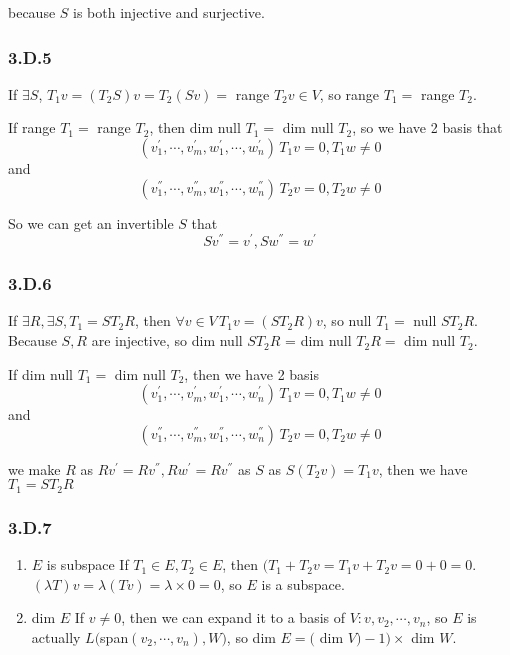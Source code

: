 because $S$ is both injective and surjective.

\subsubsection*{3.D.5}

If $\exists S$, $T_{1}v = (T_{2}S)v = T_{2}(Sv) = $ range $T_{2} v\in V$, so range $T_{1} = $ range $T_{2}$.

If range $T_{1} = $ range $T_{2}$, then dim null $T_{1} = $ dim null $T_{2}$, so we have 2 basis that
\[(v^{'}_{1}, \cdots, v^{'}_{m}, w^{'}_{1}, \cdots, w^{'}_{n})\, T_{1}v = 0, T_{1}w \neq 0\]
and
\[(v^{''}_{1}, \cdots, v^{''}_{m}, w^{''}_{1}, \cdots, w^{''}_{n})\, T_{2}v = 0, T_{2}w \neq 0\]

So we can get an invertible $S$ that
\[Sv^{''} = v^{'}, Sw^{''} = w^{'}\]

\subsubsection*{3.D.6}

If $\exists R, \exists S, T_{1} = ST_{2}R$, then $\forall v\in V\, T_{1}v = (ST_{2}R)v $, so null $T_{1} = $ null $ST_{2}R$.
Because $S,R$ are injective, so dim null $ST_{2}R$ = dim null $T_{2}R = $ dim null $T_{2}$.

If dim null $T_{1} = $ dim null $T_{2}$, then we have 2 basis
\[(v^{'}_{1}, \cdots, v^{'}_{m}, w^{'}_{1}, \cdots, w^{'}_{n})\, T_{1}v = 0, T_{1}w \neq 0\]
and
\[(v^{''}_{1}, \cdots, v^{''}_{m}, w^{''}_{1}, \cdots, w^{''}_{n})\, T_{2}v = 0, T_{2}w \neq 0\]

we make $R$ as $Rv^{'} = Rv^{''}, Rw^{'} = Rv^{''}$ as $S$ as $S(T_{2}v) = T_{1}v$, then we have $T_{1} = ST_{2}R$


\subsubsection*{3.D.7}
\begin{enumerate}[label=(\alph*)]
\item $E$ is subspace
If $T_{1} \in E, T_{2} \in E$, then $(T_{1} + T_{2}v = T_{1}v + T_{2}v = 0 + 0 = 0$. $(\lambda T)v = \lambda (Tv) = \lambda \times 0 = 0$, so $E$ is a subspace.
\item dim $E$
If $v\neq 0$, then we can expand it to a basis of $V: v, v_{2},\cdots, v_{n}$, so $E$ is actually $L($span$(v_{2}, \cdots, v_{n}), W)$, so 
dim $E = ($ dim $V) - 1) \times $ dim $W$.
\end{enumerate}

